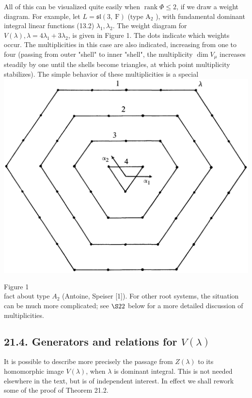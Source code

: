\documentclass[10pt]{article}
\begin{document}
All of this can be visualized quite easily when $\operatorname{rank} \Phi \leq 2$, if we draw a weight diagram. For example, let $L=\mathfrak{s l}(3, \mathrm{~F})$ (type $\mathrm{A}_{2}$ ), with fundamental dominant integral linear functions (13.2) $\lambda_{1}, \lambda_{2}$. The weight diagram for $V(\lambda), \lambda=4 \lambda_{1}+3 \lambda_{2}$, is given in Figure 1. The dots indicate which weights occur. The multiplicities in this case are also indicated, increasing from one to four (passing from outer "shell" to inner "shell", the multiplicity $\operatorname{dim} V_{\mu}$ increases steadily by one until the shells become triangles, at which point multiplicity stabilizes). The simple behavior of these multiplicities is a special\\
\includegraphics[max width=\textwidth, center]{2025_06_06_fac2836a92464059da43g-128}

Figure 1\\
fact about type $A_{2}$ (Antoine, Speiser [1]). For other root systems, the situation can be much more complicated; see $\S 22$ below for a more detailed discussion of multiplicities.

\subsection*{21.4. Generators and relations for $V(\lambda)$}
It is possible to describe more precisely the passage from $Z(\lambda)$ to its homomorphic image $V(\lambda)$, when $\lambda$ is dominant integral. This is not needed elsewhere in the text, but is of independent interest. In effect we shall rework some of the proof of Theorem 21.2.
\end{document}
